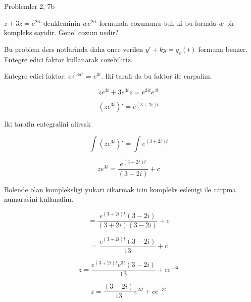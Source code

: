\documentclass[12pt,fleqn]{article}\usepackage{../common}
\begin{document}
Problemler 2, 7b

$\dot{z} + 3z = e^{2it}$ denkleminin $we^{2it}$ formunda cozumunu bul, ki
bu formda $w$ bir kompleks sayidir. Genel cozum nedir? 

Bu problem ders notlarinda daha once verilen $y' + ky = q_e(t)$ formuna
benzer. Entegre edici faktor kullanarak cozebiliriz. 

Entegre edici faktor: $e^{\int 3 dt}$ = $e^{3t}$. Iki tarafi da bu faktor
ile carpalim. 

\[ \dot{z}e^{3t} + 3e^{3t}z = e^{2it}e^{3t} \]

\[ (ze^{3t})' = e^{(3+2i)t} \]

Iki tarafin entegralini alirsak

\[ \int (ze^{3t})' = \int e^{(3+2i)t} \]

\[ ze^{3t} =  \frac {e^{(3+2i)t}}{(3+2i)} + c\]

Bolende olan kompleksligi yukari cikarmak icin kompleks eslenigi ile
carpma numarasini kullanalim. 

\[ =  \frac {e^{(3+2i)t}(3-2i)}{(3+2i)(3-2i)} + c\]

\[ =  \frac {e^{(3+2i)t}(3-2i)}{13} + c\]

\[ z =  \frac {e^{(3+2i)t}e^{3t}(3-2i)}{13} + c e^{-3t}\]

\[ z = \frac {(3-2i)}{13} e^{2it} + c e^{-3t}\]
\end{document}
